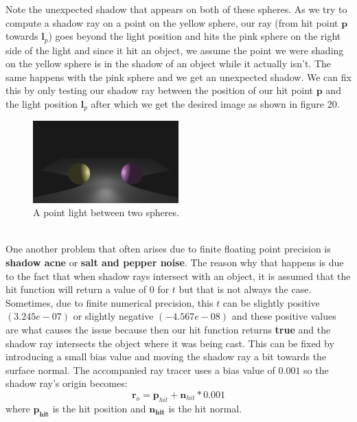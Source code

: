 \documentclass[11pt,a4paper]{article}
\begin{document}
	\noindent
	Note the unexpected shadow that appears on both of these spheres. As we try to compute a shadow ray on a point on the yellow sphere, our ray (from hit point $\boldsymbol{p}$ towards $\boldsymbol{l}_{p}$) goes beyond the light position and hits the pink sphere on the right side of the light and since it hit an object, we assume the point we were shading on the yellow sphere is in the shadow of an object while it actually isn't. The same happens with the pink sphere and we get an unexpected shadow. We can fix this by only testing our shadow ray between the position of our hit point $\boldsymbol{p}$ and the light position $\boldsymbol{l}_{p}$ after which we get the desired image as shown in figure 20.
	\\
	\begin{figure}[H]
		\centering
		\captionsetup{justification=centering}
		\includegraphics[width=0.5\textwidth]{shadow_ray_problem_fix.png}\quad
		\caption{A point light between two spheres.}
	\end{figure}
	
	\noindent
	\\
	One another problem that often arises due to finite floating point precision is \textbf{shadow acne} or \textbf{salt and pepper noise}. The reason why that happens is due to the fact that when shadow rays intersect with an object, it is assumed that the hit function will return a value of $0$ for $t$ but that is not always the case. Sometimes, due to finite numerical precision, this $t$ can be slightly positive $(3.245e-07)$ or slightly negative $(-4.567e-08)$ and these positive values are what causes the issue because then our hit function returns \textbf{true} and the shadow ray intersects the object where it was being cast. This can be fixed by introducing a small bias value and moving the shadow ray a bit towards the surface normal. The accompanied ray tracer uses a bias value of $0.001$ so the shadow ray's origin becomes:
	\begin{equation}
		\boldsymbol{r}_{o} = \boldsymbol{p}_{hit} + \boldsymbol{n}_{hit} * 0.001
	\end{equation}
	where $\boldsymbol{p_{hit}}$ is the hit position and $\boldsymbol{n_{hit}}$ is the hit normal.
	
\end{document}
